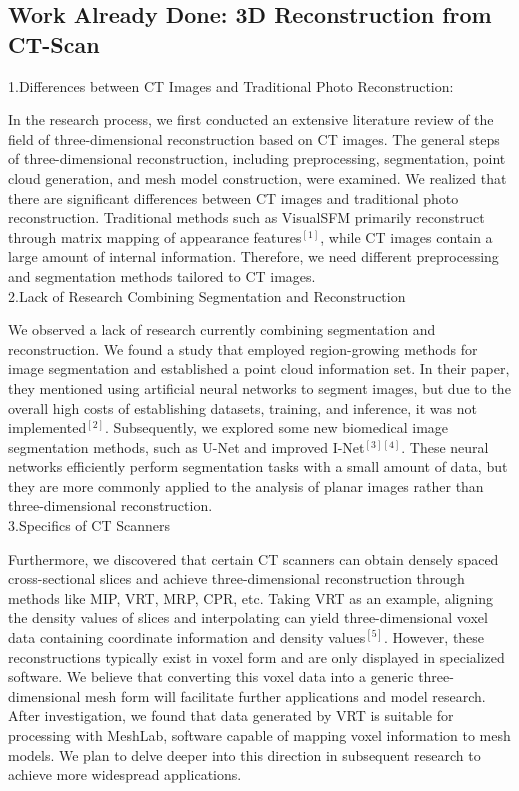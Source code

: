 \documentclass[12pt,a4paper]{report}
\begin{document}
\subsection{Work Already Done: 3D Reconstruction from CT-Scan}

1.Differences between CT Images and Traditional Photo Reconstruction:

\qquad In the research process, we first conducted an extensive literature review of the field of three-dimensional reconstruction based on CT images. The general steps of three-dimensional
reconstruction, including preprocessing, segmentation, point cloud generation, and mesh model construction, were examined. We realized that there are significant differences between CT images
and traditional photo reconstruction. Traditional methods such as VisualSFM primarily reconstruct through matrix mapping of appearance features$^{[1]}$, while CT images contain a large amount of
internal information. Therefore, we need different preprocessing and segmentation methods tailored to CT images.\\

2.Lack of Research Combining Segmentation and Reconstruction

\qquad We observed a lack of research currently combining segmentation and reconstruction. We found a study that employed region-growing methods for image segmentation and established a point cloud
information set. In their paper, they mentioned using artificial neural networks to segment images, but due to the overall high costs of establishing datasets, training, and inference, it was
not implemented$^{[2]}$. Subsequently, we explored some new biomedical image segmentation methods, such as U-Net and improved I-Net$^{[3][4]}$. These neural networks efficiently perform segmentation tasks
with a small amount of data, but they are more commonly applied to the analysis of planar images rather than three-dimensional reconstruction.\\

3.Specifics of CT Scanners

\qquad Furthermore, we discovered that certain CT scanners can obtain densely spaced cross-sectional slices and achieve three-dimensional reconstruction through methods like MIP, VRT, MRP, CPR, etc.
Taking VRT as an example, aligning the density values of slices and interpolating can yield three-dimensional voxel data containing coordinate information and density values$^{[5]}$. However, these
reconstructions typically exist in voxel form and are only displayed in specialized software. We believe that converting this voxel data into a generic three-dimensional mesh form will facilitate
further applications and model research. After investigation, we found that data generated by VRT is suitable for processing with MeshLab, software capable of mapping voxel information to mesh models.
We plan to delve deeper into this direction in subsequent research to achieve more widespread applications.\\
\end{document}
